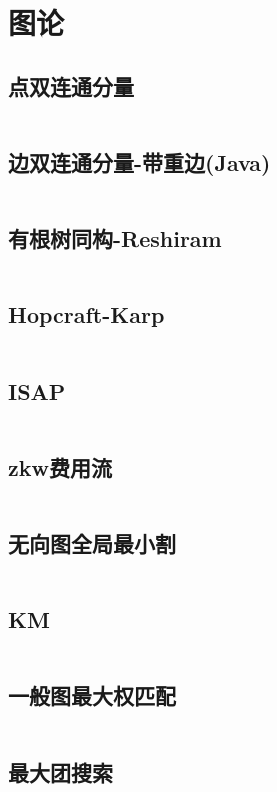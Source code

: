 \section{图论}
\subsection{点双连通分量}
\inputminted[breaklines]{cpp}{./graph-theory/vertex-biconnected-component.cpp}
\subsection{边双连通分量-带重边(Java)}
\inputminted[breaklines]{java}{./graph-theory/edge-biconnected-component.java}
\subsection{有根树同构-Reshiram}
\inputminted[breaklines]{cpp}{./graph-theory/rooted-tree-isomorphism-Reshiram.cpp}
\subsection{Hopcraft-Karp}
\inputminted[breaklines]{cpp}{./graph-theory/Hopcroft-Karp.cpp}
\subsection{ISAP}
\inputminted[breaklines]{cpp}{./graph-theory/ISAP-maximum-flow.cpp}
\subsection{zkw费用流}
\inputminted[breaklines]{cpp}{./graph-theory/zkw-cost-flow.cpp}
\subsection{无向图全局最小割}
\inputminted[breaklines]{cpp}{./graph-theory/StoerWagner.cpp}
\subsection{KM}
\inputminted[breaklines]{cpp}{./graph-theory/KM-Algorithm.cpp}
\subsection{一般图最大权匹配}
\inputminted[breaklines]{cpp}{./graph-theory/general-graph-maximum-weight-matching.cpp}
\subsection{最大团搜索}
\inputminted[breaklines]{cpp}{./graph-theory/maximum-clique.cpp}
